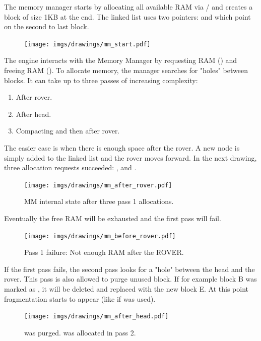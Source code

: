 \documentclass[book.tex]{subfiles}
\begin{document}
The memory manager starts by allocating all available RAM via / and creates a  block of size 1KB at the end. The linked list uses two pointers:  and  which point on the second to last block.
 \par
\begin{figure}[H]
\centering
 \texttt{[image: imgs/drawings/mm\_start.pdf]}
 \end{figure}
 \par
 The engine interacts with the Memory Manager by requesting RAM () and freeing RAM (). To allocate memory, the manager searches for "holes" between blocks. It can take up to three passes of increasing complexity:
\begin{enumerate}
\item After rover.
\item After head.
\item Compacting and then after rover.
\end{enumerate}
\par
  The easier case is when there is enough space after the rover. A new node is simply added to the linked list and the rover moves forward. In the next drawing, three allocation requests succeeded: ,  and .\\
  \par
\begin{figure}[H]
\centering
 \texttt{[image: imgs/drawings/mm\_after\_rover.pdf]}
 \caption{MM internal state after three pass 1 allocations.}
 \end{figure}
 \par
Eventually the free RAM will be exhausted and the first pass will fail.
  \par
\begin{figure}[H]
\centering
 \texttt{[image: imgs/drawings/mm\_before\_rover.pdf]}
 \caption{Pass 1 failure: Not enough RAM after the ROVER.}
 \end{figure}
 \par
 If the first pass fails, the second pass looks for a "hole" between the head and the rover. This pass is also allowed to purge unused block. If for example block B was marked as , it will be deleted and replaced with the new block E. At this point fragmentation starts to appear (like if  was used).\\
 \begin{figure}[H]
\centering
 \texttt{[image: imgs/drawings/mm\_after\_head.pdf]}
 \caption{ was purged.  was allocated in pass 2.}
 \end{figure}
\end{document}

